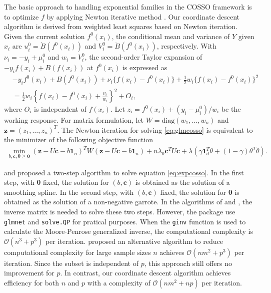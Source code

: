 The basic approach to handling exponential families in the COSSO framework is to optimize \(f\) by applying Newton iterative method \citep{Gu:2013}. Our coordinate descent algorithm is derived from weighted least squares based on Newton iteration. Given the current solution \(f^0(x_i)\), the conditional mean and variance of \(Y\) given \(x_i\) are \(u_i^0 = \dot{B}(f^0(x_i))\) and \(V_i^0 = \ddot{B}(f^0(x_i))\), respectively. With \(\nu_i = -y_i + \mu_i^0\) and \(w_i = V_i^0\), the second-order Taylor expansion of \(-y_i f(x_i) + B(f(x_i))\) at \(f^0(x_i)\) is expressed as
\begin{align*}
    &-y_i f^0(x_i) + B(f^0(x_i)) + \nu_i\{f(x_i) - f^0(x_i)\}
    + \frac{1}{2} w_i \{f(x_i) - f^0(x_i)\}^2 \\
    &= \frac{1}{2} w_i \left\{f(x_i) - f^0(x_i) + \frac{\nu_i}{w_i}\right\}^2 + O_i,
\end{align*}
where \(O_i\) is independent of \(f(x_i)\). Let \(z_i = f^0(x_i) + (y_i - \mu_i^0)/w_i\) be the working response. For matrix formulation, let \(W = \text{diag}(w_1, \dots, w_n)\) and \(\pmb{z} = (z_1, \dots, z_n)^T\). The Newton iteration for solving \eqref{eq:glmcosso} is equivalent to the minimizer of the following objective function
\begin{align}
    \min_{b, \pmb{c}, \pmb{\theta} \geq \pmb{0}} 
    ( \pmb{z} - U \pmb{c} - b \pmb{1}_n )^T W ( \pmb{z} - U \pmb{c} - b \pmb{1}_n )
    + n \lambda_0 \pmb{c}^T U \pmb{c} 
    + \lambda (\gamma \pmb{1}_d^T \theta + (1-\gamma) \theta^T \theta).
    \label{eq:expcosso} 
\end{align}

\citet{Lin:2006} and \citet{Zhang:2006} proposed a two-step algorithm to solve equation \eqref{eq:expcosso}. In the first step, with \(\pmb{\theta}\) fixed, the solution for \((b, \pmb{c})\) is obtained as the solution of a smoothing spline. In the second step, with \((b, \pmb{c})\) fixed, the solution for \(\pmb{\theta}\) is obtained as the solution of a non-negative garrote. In the algorithms of \citet{Lin:2006} and \citet{Zhang:2006}, the inverse matrix is needed to solve these two steps. However, the  package use \texttt{glmnet} and \texttt{solve.QP} for pratical purposes. When the \texttt{ginv} function is used to calculate the Moore-Penrose generalized inverse, the computational complexity is \(\mathcal{O}(n^3+p^3)\) per iteration.
\citet{Lin:2006} proposed an alternative algorithm to reduce computational complexity for large sample sizes \(n\) achieves \(\mathcal{O}(nm^2+p^3)\) per iteration. Since the subset is independent of \(p\), this approach still offers no improvement for \(p\). In contrast, our coordinate descent algorithm achieves efficiency for both \(n\) and \(p\) with a complexity of \(\mathcal{O}(nm^2+np)\) per iteration.

